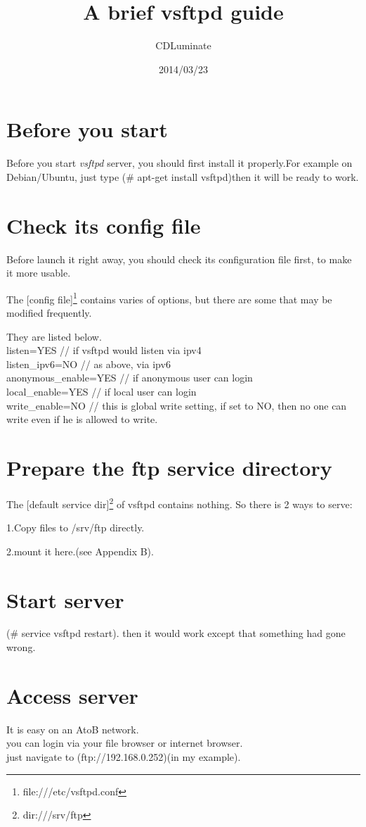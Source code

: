 \documentclass[11pt]{article}
\title{\textbf{A brief vsftpd guide}}
\author{CDLuminate}
\date{2014/03/23}
\begin{document}
\maketitle

\section{Before you start}

Before you start \emph{vsftpd} server, you should first install it properly.For example on Debian/Ubuntu, just type (\# apt-get install vsftpd)then it will be ready to work.


\section{Check its config file}
Before launch it right away, you should check its configuration file first, to make it more usable.

The [config file]\footnote{file:///etc/vsftpd.conf} contains varies of options, but there are some that may be modified frequently.
 
They are listed below.\\
listen=YES	// if vsftpd would listen via ipv4\\
listen\_ipv6=NO  // as above, via ipv6\\
anonymous\_enable=YES  // if anonymous user can login\\
local\_enable=YES  // if local user can login\\
write\_enable=NO // this is global write setting, if set to NO, then no one can write even if he is allowed to write.\\

\section{Prepare the ftp service directory}
The [default service dir]\footnote{dir:///srv/ftp} of vsftpd contains nothing. So there is 2 ways to serve:

1.Copy files to /srv/ftp directly.

2.mount it here.(see Appendix B).

\section{Start server}
(\# service vsftpd restart). then it would work except that something had gone wrong.

\section{Access server}
It is easy on an AtoB network.\\
you can login via your file browser or internet browser.\\
just navigate to (ftp://192.168.0.252)(in my example).\\
\end{document}
